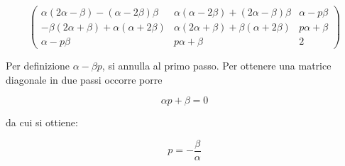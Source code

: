 \documentclass{article}
\begin{document}
$$\left(
\begin{array}{ccc}
 \alpha  (2 \alpha -\beta )-(\alpha -2 \beta ) \beta  & \alpha  (\alpha -2 \beta )+(2 \alpha -\beta ) \beta  & \alpha -p \beta  \\
 -\beta  (2 \alpha +\beta )+\alpha  (\alpha +2 \beta ) & \alpha  (2 \alpha +\beta )+\beta  (\alpha +2 \beta ) & p \alpha +\beta  \\
 \alpha -p \beta  & p \alpha +\beta  & 2
\end{array}
\right)$$

Per definizione $\alpha - \beta p$, si annulla al primo passo. Per ottenere una matrice diagonale in due passi occorre porre 

$$\alpha p + \beta = 0$$ 

da cui si ottiene:

$$p = -\frac{\beta}{\alpha} $$
\end{document}
